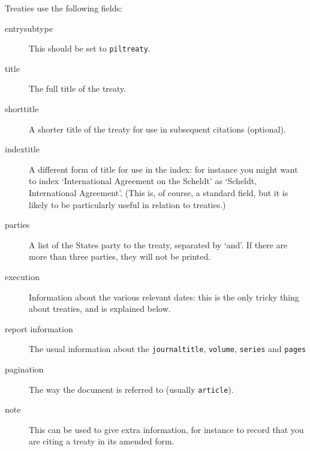 \documentclass[a5paper,fontsize=9pt,DIV=1]{scrartcl}
\begin{document}
Treaties use the following fields:
\begin{description}
\item[entrysubtype]
This should be set to \texttt{piltreaty}.
\item[title] 
The full title of the treaty.
\item[shorttitle] 
A shorter title of the treaty for use in subsequent
  citations (optional).
\item[indextitle]
  A different form of title for use in the index: for
  instance you might want to index `International Agreement on the
  Scheldt' as `Scheldt, International Agreement'. (This is, of course, a standard field, but it is likely to be particularly useful in relation to treaties.)
\item[parties]
  A list of the States party to the treaty, separated by
  `and'. If there are more than three parties, they will not be
  printed.
\item[execution]
  Information about the various relevant dates: this is
  the only tricky thing about treaties, and is explained below.
\item[\textrm{report information}] The usual information about the
  \texttt{journaltitle}, \texttt{volume}, \texttt{series} and
  \texttt{pages}
\item[pagination] The way the document is referred to (usually
  \texttt{article}).
\item[note]
  This can be used to give extra information, for instance
  to record that you are citing a treaty in its amended form.
\end{description}
\end{document}
